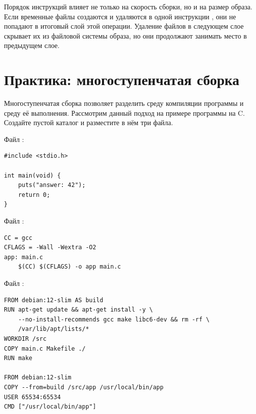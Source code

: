 Порядок инструкций влияет не только на скорость сборки, но и на размер образа. Если временные файлы создаются и удаляются в одной инструкции , они не попадают в итоговый слой этой операции. Удаление файлов в следующем слое скрывает их из файловой системы образа, но они продолжают занимать место в предыдущем слое.

\section{Практика: многоступенчатая сборка}

Многоступенчатая сборка позволяет разделить среду компиляции программы и среду её выполнения. Рассмотрим данный подход на примере программы на C. Создайте пустой каталог  и разместите в нём три файла.

\par\addvspace{10pt}\noindent\begin{minipage}{\linewidth}
\setlength{\parindent}{0pt}\noindent\hspace*{1.25cm}Файл :\par\kern 10pt
\begin{verbatim}
#include <stdio.h>

int main(void) {
    puts("answer: 42");
    return 0;
}
\end{verbatim}
\end{minipage}\par\addvspace{10pt}

\par\addvspace{10pt}\noindent\begin{minipage}{\linewidth}
\setlength{\parindent}{0pt}\noindent\hspace*{1.25cm}Файл :\par\kern 10pt
\begin{verbatim}
CC = gcc
CFLAGS = -Wall -Wextra -O2
app: main.c
    $(CC) $(CFLAGS) -o app main.c
\end{verbatim}
\end{minipage}\par\addvspace{10pt}
\par\addvspace{10pt}\noindent\begin{minipage}{\linewidth}
\setlength{\parindent}{0pt}\noindent\hspace*{1.25cm}Файл :\par\kern 10pt
\begin{verbatim}
FROM debian:12-slim AS build
RUN apt-get update && apt-get install -y \
    --no-install-recommends gcc make libc6-dev && rm -rf \
    /var/lib/apt/lists/*
WORKDIR /src
COPY main.c Makefile ./
RUN make

FROM debian:12-slim
COPY --from=build /src/app /usr/local/bin/app
USER 65534:65534
CMD ["/usr/local/bin/app"]
\end{verbatim}
\end{minipage}\par\addvspace{10pt}


